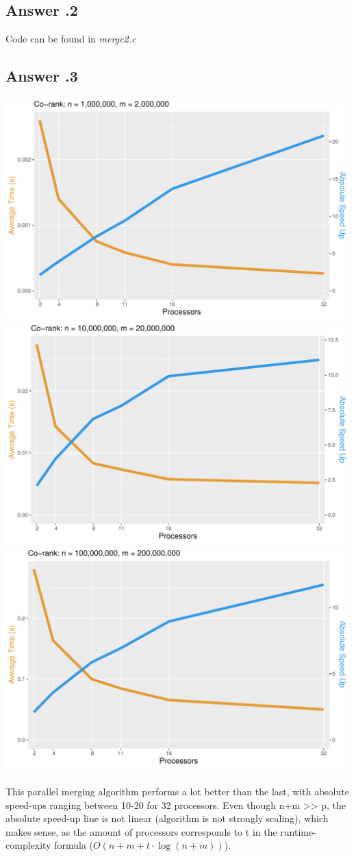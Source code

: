 \documentclass[a4paper,%
11pt,%
DIV=12,
headsepline,%
headings=normal,
]{scrartcl}
\newcounter{curex}
\newcommand{\answer}[1]{\subsection*{Answer \arabic{curex}.#1}}
\begin{document}
\answer{2}
Code can be found in \textit{merge2.c}
\answer{3}
\includegraphics[scale=0.4,page=1]{../plots/merge_plot_Co-rank_1000000_2000000}
\includegraphics[scale=0.4,page=1]{../plots/merge_plot_Co-rank_10000000_20000000}
\includegraphics[scale=0.4,page=1]{../plots/merge_plot_Co-rank_100000000_200000000}
\\
\\
This parallel merging algorithm performs a lot better than the last, with absolute speed-ups ranging between 10-20 for 32 processors. Even though n+m >> p, the absolute speed-up line is not linear (algorithm is not strongly scaling), which makes sense, as the amount of processors corresponds to t in the runtime-complexity formula ($O(n + m + t \cdot \log(n+m))$).
\end{document}
